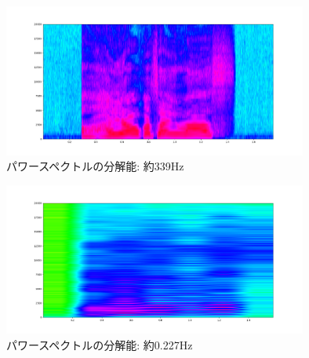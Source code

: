 \documentclass[dvipdfmx,uplatex]{jsarticle}
\begin{document}
    \begin{figure}[h]
      \begin{center}
        \includegraphics[width=100mm]{Figure_2.png}
        \caption{パワースペクトルの分解能: 約339Hz}
      \end{center}
    \end{figure}

    \newpage

    \begin{figure}[h]
      \begin{center}
        \includegraphics[width=100mm]{Figure_3.png}
        \caption{パワースペクトルの分解能: 約0.227Hz}
      \end{center}
    \end{figure}

\end{document}
